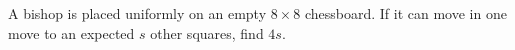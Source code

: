 A bishop is placed uniformly on an empty $8\times8$ chessboard. If it can move in one move to an expected $s$ other squares, find $4s$.
